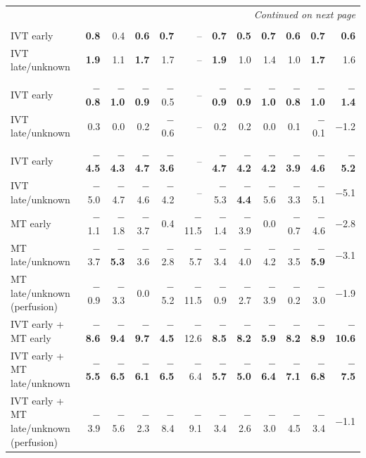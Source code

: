 \begin{landscape}
{\begin{longtable}{p{4.9cm}rrrrrrrrrrr}
\midrule
\endhead
\midrule
\multicolumn{12}{r}{\textit{Continued on next page}}\\
\endfoot
\bottomrule
\endlastfoot
\multicolumn{12}{l}{\textbf{NIHSS 1--5}}\\
IVT early & \textbf{0.8} & 0.4 & \textbf{0.6} & \textbf{0.7} & -- & \textbf{0.7} & \textbf{0.5} & \textbf{0.7} & \textbf{0.6} & \textbf{0.7} & \textbf{0.6} \\
IVT late/unknown & \textbf{1.9} & 1.1 & \textbf{1.7} & 1.7 & -- & \textbf{1.9} & 1.0 & 1.4 & 1.0 & \textbf{1.7} & 1.6 \\
\addlinespace
\multicolumn{12}{l}{\textbf{NIHSS 6--10}}\\
IVT early & \textbf{$-$0.8} & \textbf{$-$1.0} & \textbf{$-$0.9} & $-$0.5 & -- & \textbf{$-$0.9} & \textbf{$-$0.9} & \textbf{$-$1.0} & \textbf{$-$0.8} & \textbf{$-$1.0} & \textbf{$-$1.4} \\
IVT late/unknown & 0.3 & 0.0 & 0.2 & $-$0.6 & -- & 0.2 & 0.2 & 0.0 & 0.1 & $-$0.1 & $-$1.2 \\
\addlinespace
\multicolumn{12}{l}{\textbf{NIHSS 11--15}}\\
IVT early & \textbf{$-$4.5} & \textbf{$-$4.3} & \textbf{$-$4.7} & \textbf{$-$3.6} & -- & \textbf{$-$4.7} & \textbf{$-$4.2} & \textbf{$-$4.2} & \textbf{$-$3.9} & \textbf{$-$4.6} & \textbf{$-$5.2} \\
IVT late/unknown & $-$5.0 & $-$4.7 & $-$4.6 & $-$4.2 & -- & $-$5.3 & \textbf{$-$4.4} & $-$5.6 & $-$3.3 & $-$5.1 & $-$5.1 \\
MT early & $-$1.1 & $-$1.8 & $-$3.7 & 0.4 & $-$11.5 & $-$1.4 & $-$3.9 & 0.0 & $-$0.7 & $-$4.6 & $-$2.8 \\
MT late/unknown & $-$3.7 & \textbf{$-$5.3} & $-$3.6 & $-$2.8 & $-$5.7 & $-$3.4 & $-$4.0 & $-$4.2 & $-$3.5 & \textbf{$-$5.9} & $-$3.1 \\
MT late/unknown (perfusion) & $-$0.9 & $-$3.3 & 0.0 & $-$5.2 & $-$11.5 & $-$0.9 & $-$2.7 & $-$3.9 & $-$0.2 & $-$3.0 & $-$1.9 \\
IVT early + MT early & \textbf{$-$8.6} & \textbf{$-$9.4} & \textbf{$-$9.7} & \textbf{$-$4.5} & $-$12.6 & \textbf{$-$8.5} & \textbf{$-$8.2} & \textbf{$-$5.9} & \textbf{$-$8.2} & \textbf{$-$8.9} & \textbf{$-$10.6} \\
IVT early + MT late/unknown & \textbf{$-$5.5} & \textbf{$-$6.5} & \textbf{$-$6.1} & \textbf{$-$6.5} & $-$6.4 & \textbf{$-$5.7} & \textbf{$-$5.0} & \textbf{$-$6.4} & \textbf{$-$7.1} & \textbf{$-$6.8} & \textbf{$-$7.5} \\
IVT early + MT late/unknown (perfusion) & $-$3.9 & $-$5.6 & $-$2.3 & $-$8.4 & $-$9.1 & $-$3.4 & $-$2.6 & $-$3.0 & $-$4.5 & $-$3.4 & $-$1.1 \\

\end{longtable}}
\end{landscape}
